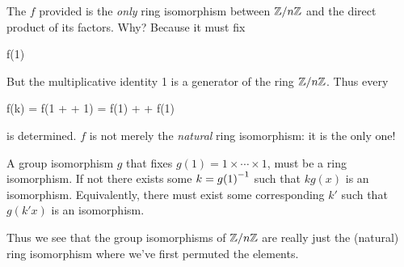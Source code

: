 \begin{remark}
  The $f$ provided is the \emph{only} ring isomorphism between $\mathbb{Z} / n\mathbb{Z}$
  and the direct product of its factors. Why? Because it must fix

  \begin{nedqn}
    f(1)
   \times \cdots {}
  \end{nedqn}

  \noindent
  But the multiplicative identity 1 is a generator of the ring $\mathbb{Z} / n\mathbb{Z}$.
  Thus every

  \begin{nedqn}
    f(k) = f(1 + \cdots + 1) = f(1) + \cdots + f(1)
  \end{nedqn}

  \noindent
  is determined. $f$ is not merely the \emph{natural} ring isomorphism:
  it is the only one!
\end{remark}

\begin{remark}
  A group isomorphism $g$ that fixes $g(1) = 1 \times\cdots\times 1$,
  must be a ring isomorphism. If not there exists some $k = {g(1)}^{-1}$
  such that $k g(x)$ is an isomorphism. Equivalently, there must exist
  some corresponding $k'$ such that $g(k'x)$ is an isomorphism.

  Thus we see that the group isomorphisms of $\mathbb{Z} / n\mathbb{Z}$ are really just
  the (natural) ring isomorphism where we've first permuted the
  elements.
\end{remark}
